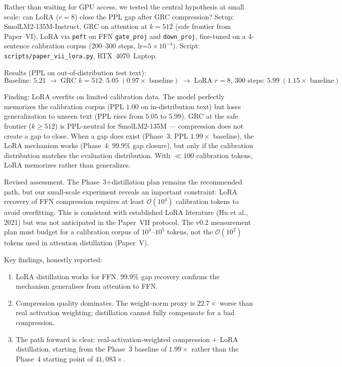 \documentclass[11pt]{article}
\begin{document}
Rather than waiting for GPU access, we tested the central hypothesis
at small scale: can LoRA ($r{=}8$) close the PPL gap after GRC
compression?  Setup: SmolLM2-135M-Instruct, GRC on attention at
$k{=}512$ (safe frontier from Paper~VI), LoRA via \texttt{peft} on
FFN \texttt{gate\_proj} and \texttt{down\_proj}, fine-tuned on a
4-sentence calibration corpus (200–300 steps, lr=${5}{\times}10^{-4}$).
Script: \texttt{scripts/paper\_vii\_lora.py}, RTX~4070~Laptop.

Results (PPL on out-of-distribution test text):
\[
\text{Baseline: } 5.21 \;\rightarrow\;
\text{GRC $k{=}512$: } 5.05 \; (0.97{\times}\text{ baseline}) \;\rightarrow\;
\text{LoRA $r{=}8$, 300~steps: } 5.99 \; (1.15{\times}\text{ baseline})
\]

Finding: LoRA overfits on limited calibration data.  The
model perfectly memorizes the calibration corpus (PPL $1.00$ on
in-distribution text) but loses generalization to unseen text
(PPL rises from $5.05$ to $5.99$).  GRC at the safe frontier ($k{\ge}512$)
is PPL-neutral for SmolLM2-135M — compression does not create a gap to
close.  When a gap does exist (Phase~3: PPL $1.99{\times}$ baseline),
the LoRA mechanism works (Phase~4: $99.9\%$ gap closure), but
only if the calibration distribution matches the evaluation
distribution.  With ${\ll}100$ calibration tokens, LoRA memorizes
rather than generalizes.

Revised assessment.  The Phase~3+distillation plan remains
the recommended path, but our small-scale experiment reveals an
important constraint: LoRA recovery of FFN compression requires at
least $\mathcal{O}(10^4)$ calibration tokens to avoid overfitting.
This is consistent with established LoRA literature (Hu et al., 2021)
but was not anticipated in the Paper~VII protocol.  The v0.2 measurement
plan must budget for a calibration corpus of $10^4$–$10^5$ tokens,
not the $\mathcal{O}(10^2)$ tokens used in attention distillation
(Paper~V).

Key findings, honestly reported:
\begin{enumerate}
\item LoRA distillation works for FFN.  $99.9\%$ gap recovery
      confirms the mechanism generalises from attention to FFN.
\item Compression quality dominates.  The weight-norm proxy
      is $22.7{\times}$ worse than real activation weighting; distillation
      cannot fully compensate for a bad compression.
\item The path forward is clear: real-activation-weighted
      compression + LoRA distillation, starting from the Phase~3
      baseline of $1.99{\times}$ rather than the Phase~4 starting
      point of $41{,}083{\times}$.
\end{enumerate}
\end{document}
